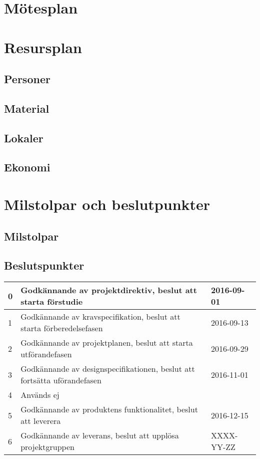 \documentclass{article}
\begin{document}
\section{Mötesplan}
\section{Resursplan}
\subsection{Personer}
\subsection{Material}
\subsection{Lokaler}
\subsection{Ekonomi}

\section{Milstolpar och beslutpunkter}
\subsection{Milstolpar}
\subsection{Beslutspunkter}
\begin{center}
  \begin{tabular}{ | l | l | l | }
    \hline
    0 & Godkännande av projektdirektiv, beslut att starta förstudie & 2016-09-01 \\ \hline
    1 & Godkännande av kravspecifikation, beslut att starta förberedelsefasen & 2016-09-13 \\ \hline
    2 & Godkännande av projektplanen, beslut att starta utförandefasen & 2016-09-29 \\ \hline
    3 & Godkännande av designspecifikationen, beslut att fortsätta uförandefasen & 2016-11-01 \\ \hline
    4 & Används ej &  \\ \hline
    5 & Godkännande av produktens funktionalitet, beslut att leverera & 2016-12-15 \\ \hline
    6 & Godkännande av leverans, beslut att upplösa projektgruppen & XXXX-YY-ZZ \\ \hline
    \hline
  \end{tabular}
\end{center}
\end{document}
